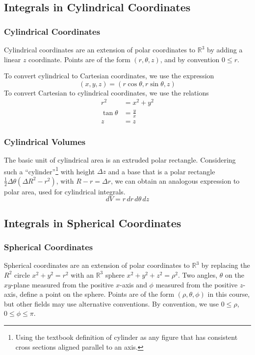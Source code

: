 \documentclass{article}
\begin{document}
\subsection{Integrals in Cylindrical Coordinates}
\subsubsection{Cylindrical Coordinates}
Cylindrical coordinates are an extension of polar coordinates to $\mathbb{R}^3$ by adding a linear $z$ coordinate. Points are of the form $(r,\theta,z)$, and by convention $0\le{r}$.

To convert cylindrical to Cartesian coordinates, we use the expression
$$(x,y,z)=(r\cos\theta,r\sin\theta,z)$$
To convert Cartesian to cylindrical coordinates, we use the relations
\begin{align*}
    r^2&=x^2+y^2\\
    \tan\theta&=\frac{y}{x}\\
    z&=z
\end{align*}

\subsubsection{Cylindrical Volumes}
The basic unit of cylindrical area is an extruded polar rectangle.
Considering such a ``cylinder''\footnote{Using the textbook definition of cylinder as any figure that has consistent cross sections aligned parallel to an axis.} with height $\Delta z$ and a base that is a polar rectangle $\frac{1}{2}\Delta\theta(\Delta R^2-r^2)$, with $R-r = \Delta{r}$, we can obtain an analogous expression to polar area, used for cylindrical integrals.
$$dV=r\,dr\,d\theta\,dz$$

\subsection{Integrals in Spherical Coordinates}
\subsubsection{Spherical Coordinates}
Spherical coordinates are an extension of polar coordinates to $\mathbb{R}^3$ by replacing the $R^2$ circle $x^2+y^2=r^2$ with an $\mathbb{R}^3$ sphere $x^2+y^2+z^2=\rho^2$. Two angles, $\theta$ on the $xy$-plane measured from the positive $x$-axis and $\phi$ measured from the positive $z$-axis, define a point on the sphere. Points are of the form $(\rho,\theta,\phi)$ in this course, but other fields may use alternative conventions. By convention, we use $0\le\rho$, $0\le\phi\le\pi$.
\end{document}
